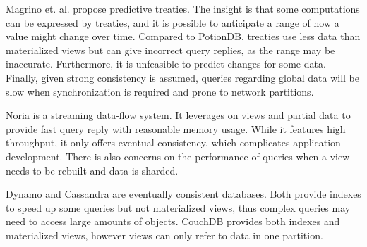 \documentclass[sigplan,twocolumn,review,anonymous]{acmart}
\begin{document}
Magrino et. al. \cite{treaties} propose predictive treaties.
The insight is that some computations can be expressed by treaties, and it is possible to anticipate a range of how a value might change over time.
Compared to PotionDB, treaties use less data than materialized views but can give incorrect query replies, as the range may be inaccurate.
Furthermore, it is unfeasible to predict changes for some data.
Finally, given strong consistency is assumed, queries regarding global data will be slow when synchronization is required and prone to network partitions.

Noria \cite{noria} is a streaming data-flow system.
It leverages on views and partial data to provide fast query reply with reasonable memory usage.
While it features high throughput, it only offers eventual consistency, which complicates application development.
There is also concerns on the performance of queries when a view needs to be rebuilt and data is sharded.

Dynamo \cite{dynamo} and Cassandra \cite{cassandra} are eventually consistent databases.
Both provide indexes to speed up some queries but not materialized views, thus complex queries may need to access large amounts of objects.
CouchDB \cite{couchDB} provides both indexes and materialized views, however views can only refer to data in one partition.




\end{document}
